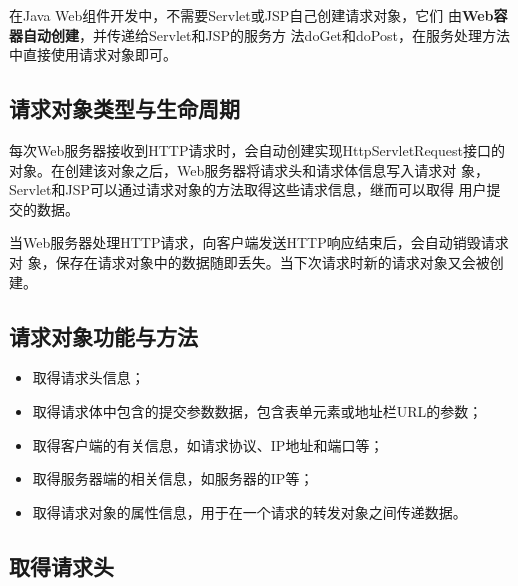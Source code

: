 
在Java Web组件开发中，不需要Servlet或JSP自己创建请求对象，它们
由{\bf\Blue Web容器自动创建}，并传递给Servlet和JSP的服务方
法doGet和doPost，在服务处理方法中直接使用请求对象即可。

\subsection{请求对象类型与生命周期} 


每次Web服务器接收到HTTP请求时，会自动创建实现HttpServletRequest接口的
对象。在创建该对象之后，Web服务器将请求头和请求体信息写入请求对
象，Servlet和JSP可以通过请求对象的方法取得这些请求信息，继而可以取得
用户提交的数据。


当Web服务器处理HTTP请求，向客户端发送HTTP响应结束后，会自动销毁请求对
象，保存在请求对象中的数据随即丢失。当下次请求时新的请求对象又会被创
建。

\subsection{请求对象功能与方法} 


\begin{itemize}
\item 取得请求头信息；
\item 取得请求体中包含的提交参数数据，包含表单元素或地址栏URL的参数；
\item 取得客户端的有关信息，如请求协议、IP地址和端口等；
\item 取得服务器端的相关信息，如服务器的IP等；
\item 取得请求对象的属性信息，用于在一个请求的转发对象之间传递数据。
\end{itemize}

\subsection{取得请求头} 

